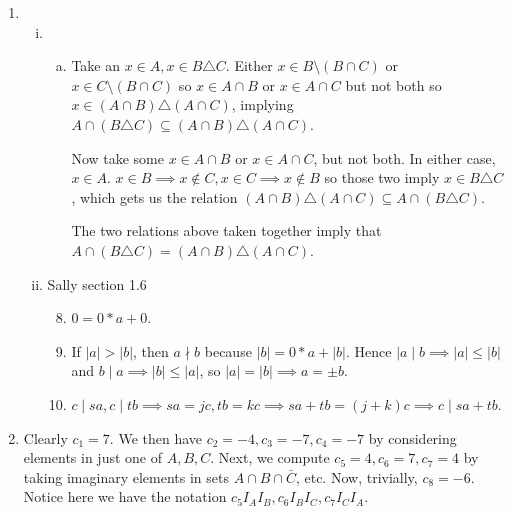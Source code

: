 \documentclass{article}
\begin{document}
\begin{enumerate}
\item \begin{enumerate}[(i)]
\item \begin{enumerate}[(x)]
\item Take an $x \in A, x \in B \triangle C$. Either $x \in B
\setminus (B \cap C)$ or $x \in C \setminus (B \cap C)$ so $x \in A \cap
B$ or $x \in A \cap C$ but not both so $x \in (A \cap B) \triangle (A
\cap C)$, implying $A \cap (B \triangle C) \subseteq (A \cap B)
\triangle (A \cap C)$.

Now take some $x \in A \cap B$ or $x \in A \cap C$, but not both. In
either case, $x \in A$. $x \in B \implies x \not \in C, x \in C \implies
x \not \in B$ so those two imply $x \in B \triangle C$, which gets us
the relation $(A \cap B) \triangle (A \cap C) \subseteq A \cap (B
\triangle C)$.

The two relations above taken together imply that $A \cap (B \triangle
C) = (A \cap B) \triangle (A \cap C)$.
\end{enumerate}
\item Sally section 1.6
\begin{enumerate}[1.]
\setcounter{enumiii}{7}
\item $0 = 0 * a + 0$.
\item If $|a| > |b|$, then $a \nmid b$ because $|b| = 0 * a + |b|$.
Hence $|a \mid b \implies |a| \leq |b|$ and $b \mid a \implies |b| \leq
|a|$, so $|a| = |b| \implies a = \pm b$.
\item $c \mid sa, c \mid tb \implies sa = jc, tb = kc \implies sa + tb =
(j + k)c \implies c \mid sa + tb$.
\end{enumerate}
\end{enumerate}

\item Clearly $c_1 = 7$. We then have $c_2 = -4, c_3 = -7, c_4 = -7$ by
considering elements in just one of $A, B, C$. Next, we compute $c_5 =
4, c_6 = 7, c_7 = 4$ by taking imaginary elements in sets $A \cap B \cap
\bar{C}$, etc. Now, trivially, $c_8 = -6$. Notice here we have the
notation $c_5 I_A I_B, c_6 I_B I_C, c_7 I_C I_A$.

\end{enumerate}
\end{document}

